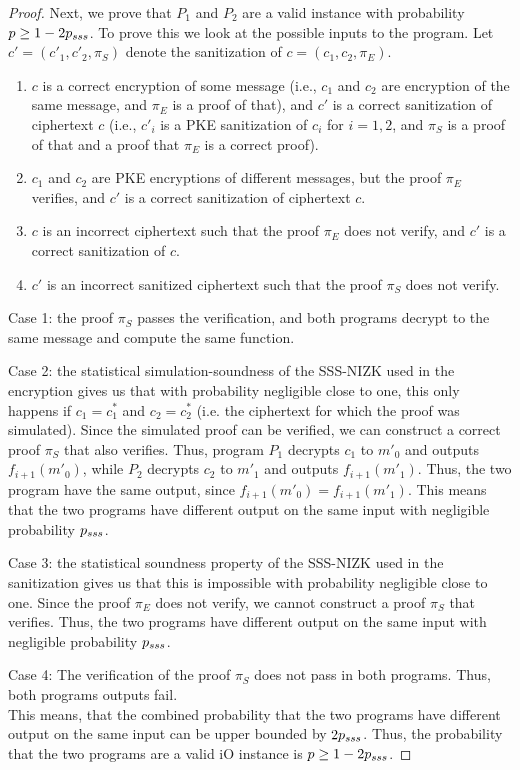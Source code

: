 \documentclass{llncs}
\begin{document}
\begin{proof}
Next, we prove that $P_1$ and $P_2$ are a valid instance with probability $p \geq  1-2p_{sss}$.
To prove this we look at the possible inputs to the program. Let $c'=(c'_1,c'_2,\pi_S)$ denote the sanitization of $c=(c_1,c_2,\pi_E)$.
\begin{enumerate}
\item $c$ is a correct encryption of some message (i.e., $c_1$ and $c_2$ are encryption of the same message, and $\pi_E$ is a proof of that), and $c'$ is a correct sanitization of ciphertext $c$ (i.e., $c'_i$ is a PKE sanitization of $c_i$ for $i=1,2$, and $\pi_S$ is a proof of that and a proof that $\pi_E$ is a correct proof).
\item $c_1$ and $c_2$ are PKE encryptions of different messages, but the proof $\pi_E$ verifies, and $c'$ is a correct sanitization of ciphertext $c$.
\item $c$ is an incorrect ciphertext such that the proof $\pi_E$ does not verify, and $c'$ is a correct sanitization of $c$.
\item $c'$ is an incorrect sanitized ciphertext such that the proof $\pi_S$ does not verify.
\end{enumerate}

Case 1: the proof $\pi_S$ passes the verification, and both programs  decrypt to the same message and compute the same function. 

Case 2: the statistical simulation-soundness of the SSS-NIZK used in the encryption gives us that with probability negligible close to one, this only happens if $c_1 = c_1^*$ and $c_2 = c_2^*$ (i.e. the ciphertext for which the proof was simulated). Since the simulated proof can be verified, we can construct a correct proof $\pi_S$ that also verifies. Thus, program $P_1$ decrypts $c_1$ to $m'_0$ and outputs $f_{i+1}(m'_0)$, while $P_2$ decrypts $c_2$ to $m'_1$ and outputs $f_{i+1}(m'_1)$. Thus, the two program have the same output, since $f_{i+1}(m'_0) = f_{i+1}(m'_1)$. 
This means that the two programs have different output on the same input with negligible probability $p_{sss}$.

Case 3: the statistical soundness property of the SSS-NIZK used in the sanitization gives us that this is impossible with probability negligible close to one. Since the proof $\pi_E$ does not verify, we cannot construct a proof $\pi_S$ that verifies. 
Thus, the two programs have different output on the same input with negligible probability $p_{sss}$.

Case 4: The verification of the proof $\pi_S$ does not pass in both programs. Thus, both programs outputs fail. \\

This means, that the combined probability that the two programs have different output on the same input can be upper bounded by  $2p_{sss}$. Thus, the probability that the two programs are a valid iO instance is $p \geq 1-2p_{sss}$.
\end{proof}
\end{document}
